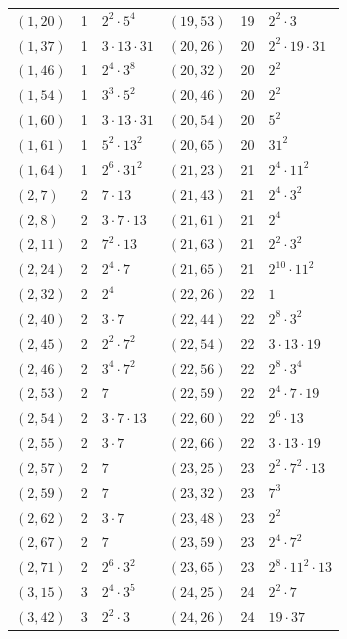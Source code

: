 \documentclass[11pt]{article}
\begin{document}
\begin{longtable}{@{}lrl@{\qquad}lrl@{}}
$(1,20)$ & 1 & $2^{2}\cdot 5^{4}$ & $(19,53)$ & 19 & $2^{2}\cdot 3$\\
$(1,37)$ & 1 & $3\cdot 13\cdot 31$ & $(20,26)$ & 20 & $2^{2}\cdot 19\cdot 31$\\
$(1,46)$ & 1 & $2^{4}\cdot 3^{8}$ & $(20,32)$ & 20 & $2^{2}$\\
$(1,54)$ & 1 & $3^{3}\cdot 5^{2}$ & $(20,46)$ & 20 & $2^{2}$\\
$(1,60)$ & 1 & $3\cdot 13\cdot 31$ & $(20,54)$ & 20 & $5^{2}$\\
$(1,61)$ & 1 & $5^{2}\cdot 13^{2}$ & $(20,65)$ & 20 & $31^{2}$\\
$(1,64)$ & 1 & $2^{6}\cdot 31^{2}$ & $(21,23)$ & 21 & $2^{4}\cdot 11^{2}$\\
$(2,7)$ & 2 & $7\cdot 13$ & $(21,43)$ & 21 & $2^{4}\cdot 3^{2}$\\
$(2,8)$ & 2 & $3\cdot 7\cdot 13$ & $(21,61)$ & 21 & $2^{4}$\\
$(2,11)$ & 2 & $7^{2}\cdot 13$ & $(21,63)$ & 21 & $2^{2}\cdot 3^{2}$\\
$(2,24)$ & 2 & $2^{4}\cdot 7$ & $(21,65)$ & 21 & $2^{10}\cdot 11^{2}$\\
$(2,32)$ & 2 & $2^{4}$ & $(22,26)$ & 22 & $1$\\
$(2,40)$ & 2 & $3\cdot 7$ & $(22,44)$ & 22 & $2^{8}\cdot 3^{2}$\\
$(2,45)$ & 2 & $2^{2}\cdot 7^{2}$ & $(22,54)$ & 22 & $3\cdot 13\cdot 19$\\
$(2,46)$ & 2 & $3^{4}\cdot 7^{2}$ & $(22,56)$ & 22 & $2^{8}\cdot 3^{4}$\\
$(2,53)$ & 2 & $7$ & $(22,59)$ & 22 & $2^{4}\cdot 7\cdot 19$\\
$(2,54)$ & 2 & $3\cdot 7\cdot 13$ & $(22,60)$ & 22 & $2^{6}\cdot 13$\\
$(2,55)$ & 2 & $3\cdot 7$ & $(22,66)$ & 22 & $3\cdot 13\cdot 19$\\
$(2,57)$ & 2 & $7$ & $(23,25)$ & 23 & $2^{2}\cdot 7^{2}\cdot 13$\\
$(2,59)$ & 2 & $7$ & $(23,32)$ & 23 & $7^{3}$\\
$(2,62)$ & 2 & $3\cdot 7$ & $(23,48)$ & 23 & $2^{2}$\\
$(2,67)$ & 2 & $7$ & $(23,59)$ & 23 & $2^{4}\cdot 7^{2}$\\
$(2,71)$ & 2 & $2^{6}\cdot 3^{2}$ & $(23,65)$ & 23 & $2^{8}\cdot 11^{2}\cdot 13$\\
$(3,15)$ & 3 & $2^{4}\cdot 3^{5}$ & $(24,25)$ & 24 & $2^{2}\cdot 7$\\
$(3,42)$ & 3 & $2^{2}\cdot 3$ & $(24,26)$ & 24 & $19\cdot 37$\\

\end{longtable}
\end{document}
